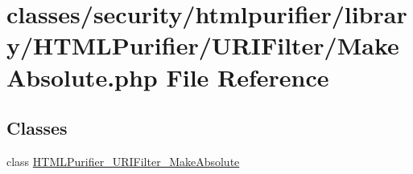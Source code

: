 \hypertarget{MakeAbsolute_8php}{\section{classes/security/htmlpurifier/library/\+H\+T\+M\+L\+Purifier/\+U\+R\+I\+Filter/\+Make\+Absolute.php File Reference}
\label{MakeAbsolute_8php}
}
\subsection*{Classes}
\begin{DoxyCompactItemize}
\item 
class \hyperlink{classHTMLPurifier__URIFilter__MakeAbsolute}{H\+T\+M\+L\+Purifier\+\_\+\+U\+R\+I\+Filter\+\_\+\+Make\+Absolute}
\end{DoxyCompactItemize}
